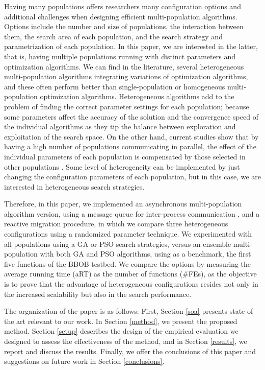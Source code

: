 Having many populations offers researchers many configuration options and
additional challenges when designing efficient multi-population algorithms.
Options include the number and size of populations, the interaction between
them, the search area of each population, and the search strategy and
parametrization of each population.  In this paper, we are interested in the
latter, that is, having multiple populations running with distinct parameters
and optimization algorithms. We can find in the literature, several
heterogeneous multi-population algorithms integrating variations of optimization
algorithms, and these often perform better than single-population or homogeneous
multi-population optimization algorithms\cite{wu2016differential,nseef2016adaptive}.
Heterogeneous algorithms add to
the problem of finding the correct parameter settings for each population;
because some parameters affect the accuracy of the solution and the convergence
speed of the individual algorithms as they tip the balance between exploration
and exploitation of the search space. On the other hand, current studies show
that by having a high number of populations communicating in parallel, the
effect of the individual parameters of each population is compensated by those
selected in other populations \cite{li2016multi,tanabe2013evaluation}. Some
level of heterogeneity can be implemented by just changing the configuration
parameters of each population, but in this case, we are interested in
heterogeneous search strategies.

Therefore, in this paper, we implemented an asynchronous multi-population
algorithm version, using a message queue for inter-process communication \cite{
guervos2018introducing}, and a reactive migration procedure, in which we compare
three heterogeneous configurations using a randomized parameter technique. We
experimented with all populations using a GA or PSO search strategies, versus an
ensemble multi-population with both GA and PSO algorithms, using as a benchmark,
the first five functions of the BBOB testbed. We compare the options by
measuring the average running time (aRT) as the number of functions (\#FEs), as
the objective is to prove that the advantage of heterogeneous configurations
resides not only in the increased scalability but also in the search
performance. 

The organization of the paper is as follows: First, Section \ref{soa} presents
state of the art relevant to our work. In Section \ref{method}, we present the
proposed method.  Section \ref{setup} describes the design of the empirical
evaluation we designed to assess the effectiveness of the method, and in Section
\ref{results}, we report and discuss the results. Finally, we offer the
conclusions of this paper and suggestions on future work in Section
\ref{conclusions}.


